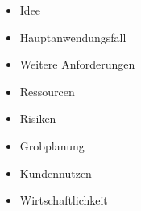 \begin{itemize}
	\item Idee
	\item Hauptanwendungsfall
	\item Weitere Anforderungen
	\item Ressourcen
	\item Risiken
	\item Grobplanung
	\item Kundennutzen
	\item Wirtschaftlichkeit
\end{itemize}
